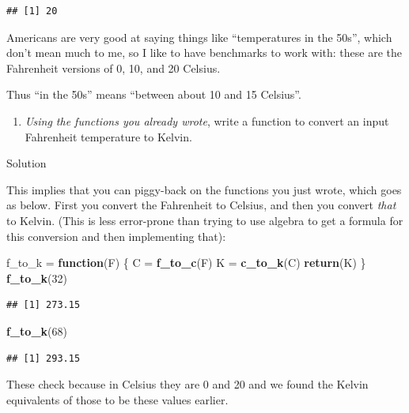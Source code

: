 \documentclass[]{tufte-book}
\newenvironment{Shaded}{}{}
\newcommand{\ControlFlowTok}[1]{\textcolor[rgb]{0.00,0.44,0.13}{\textbf{#1}}}
\newcommand{\DecValTok}[1]{\textcolor[rgb]{0.25,0.63,0.44}{#1}}
\newcommand{\KeywordTok}[1]{\textcolor[rgb]{0.00,0.44,0.13}{\textbf{#1}}}
\newcommand{\NormalTok}[1]{#1}
\newcommand{\StringTok}[1]{\textcolor[rgb]{0.25,0.44,0.63}{#1}}
\providecommand{\tightlist}{%
  \setlength{\itemsep}{0pt}\setlength{\parskip}{0pt}}
\theoremstyle{definition}
\theoremstyle{definition}
\theoremstyle{definition}
\theoremstyle{remark}
\begin{document}
\begin{verbatim}
## [1] 20
\end{verbatim}

Americans are very good at saying things like ``temperatures in the
50s'', which don't mean much to me, so I like to have benchmarks to work
with: these are the Fahrenheit versions of 0, 10, and 20 Celsius.

Thus ``in the 50s'' means ``between about 10 and 15 Celsius''.

\begin{enumerate}
\def\labelenumi{(\alph{enumi})}
\setcounter{enumi}{2}
\tightlist
\item
  \emph{Using the functions you already wrote}, write a function to
  convert an input Fahrenheit temperature to Kelvin.
\end{enumerate}

Solution

This implies that you can piggy-back on the functions you just wrote,
which goes as below. First you convert the Fahrenheit to Celsius, and
then you convert \emph{that} to Kelvin. (This is less error-prone than
trying to use algebra to get a formula for this conversion and then
implementing that):

\begin{Shaded}
\begin{Highlighting}[]
\NormalTok{f_to_k =}\StringTok{ }\ControlFlowTok{function}\NormalTok{(F) \{}
\NormalTok{    C =}\StringTok{ }\KeywordTok{f_to_c}\NormalTok{(F)}
\NormalTok{    K =}\StringTok{ }\KeywordTok{c_to_k}\NormalTok{(C)}
    \KeywordTok{return}\NormalTok{(K)}
\NormalTok{\}}
\KeywordTok{f_to_k}\NormalTok{(}\DecValTok{32}\NormalTok{)}
\end{Highlighting}
\end{Shaded}

\begin{verbatim}
## [1] 273.15
\end{verbatim}

\begin{Shaded}
\begin{Highlighting}[]
\KeywordTok{f_to_k}\NormalTok{(}\DecValTok{68}\NormalTok{)}
\end{Highlighting}
\end{Shaded}

\begin{verbatim}
## [1] 293.15
\end{verbatim}

These check because in Celsius they are 0 and 20 and we found the Kelvin
equivalents of those to be these values earlier.
\end{document}
